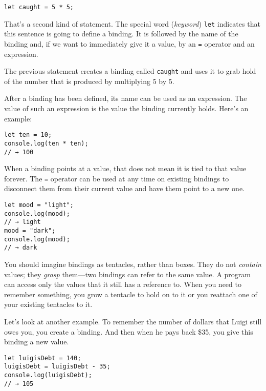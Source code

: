 \begin{lstlisting}
let caught = 5 * 5;
\end{lstlisting}
\noindent{}

That's a second kind of statement. The special word (\emph{keyword}) \lstinline`let` indicates that this sentence is going to define a binding. It is followed by the name of the binding and, if we want to immediately give it a value, by an \lstinline`=` operator and an expression.

The previous statement creates a binding called \lstinline`caught` and uses it to grab hold of the number that is produced by multiplying 5 by 5.

After a binding has been defined, its name can be used as an expression. The value of such an expression is the value the binding currently holds. Here's an example:

\begin{lstlisting}
let ten = 10;
console.log(ten * ten);
// → 100
\end{lstlisting}
\noindent{}

When a binding points at a value, that does not mean it is tied to that value forever. The \lstinline`=` operator can be used at any time on existing bindings to disconnect them from their current value and have them point to a new one.

\begin{lstlisting}
let mood = "light";
console.log(mood);
// → light
mood = "dark";
console.log(mood);
// → dark
\end{lstlisting}
\noindent{}

You should imagine bindings as tentacles, rather than boxes. They do not \emph{contain} values; they \emph{grasp} them—two bindings can refer to the same value. A program can access only the values that it still has a reference to. When you need to remember something, you grow a tentacle to hold on to it or you reattach one of your existing tentacles to it.

Let's look at another example. To remember the number of dollars that Luigi still owes you, you create a binding. And then when he pays back \$35, you give this binding a new value.

\begin{lstlisting}
let luigisDebt = 140;
luigisDebt = luigisDebt - 35;
console.log(luigisDebt);
// → 105
\end{lstlisting}
\noindent{}


